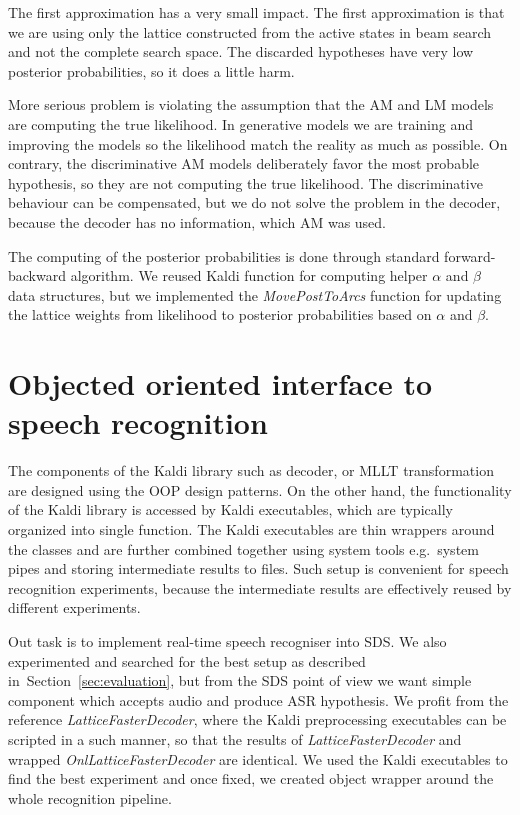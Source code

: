 The first approximation has a very small impact. The first approximation is 
that we are using only the lattice constructed from the active states in beam search
and not the complete search space. 
The discarded hypotheses have very low posterior probabilities, so it does a little harm.

More serious problem is violating the assumption that the \ac{AM} and \ac{LM} models are 
computing the true likelihood. 
In generative models we are training and improving the models so the likelihood match
the reality as much as possible.
On contrary, the discriminative \ac{AM} models deliberately favor the most probable hypothesis,
so they are not computing the true likelihood.
The discriminative behaviour can be compensated, but we do not solve the problem
in the decoder, because the decoder has no information, which \ac{AM} was used.


The computing of the posterior probabilities is done through
standard forward-backward algorithm\cite{todo}.
We reused Kaldi function for computing helper $\alpha$ and $\beta$ data structures,
but we implemented the {\it MovePostToArcs}\/ function for updating the lattice weights 
from likelihood to posterior probabilities based on $\alpha$ and $\beta$.

\section{Objected oriented interface to speech recognition}
\label{sec:ooi}
The components of the Kaldi library such as decoder, or \ac{MLLT} transformation are designed using 
the \ac{OOP} design patterns.
On the other hand, the functionality of the Kaldi library is accessed by Kaldi executables, 
which are typically organized into single function.
The Kaldi executables are thin wrappers around the classes and 
are further combined together using system tools e.g.\ system pipes
and storing intermediate results to files. 
Such setup is convenient for speech recognition experiments, because the intermediate results are  
effectively reused by different experiments.

Out task is to implement real-time speech recogniser into \acl{SDS}.
We also experimented and searched for the best setup as described in~Section~\ref{sec:evaluation},
but from the \ac{SDS} point of view we want simple component which accepts audio and produce \ac{ASR} hypothesis.
We profit from the reference {\it LatticeFasterDecoder}, where the Kaldi preprocessing executables
can be scripted in a such manner, so that the results of {\it LatticeFasterDecoder}\/ 
and wrapped {\it OnlLatticeFasterDecoder}\/ are identical.
We used the Kaldi executables to find the best experiment and once fixed,
we created object wrapper around the whole recognition pipeline.

